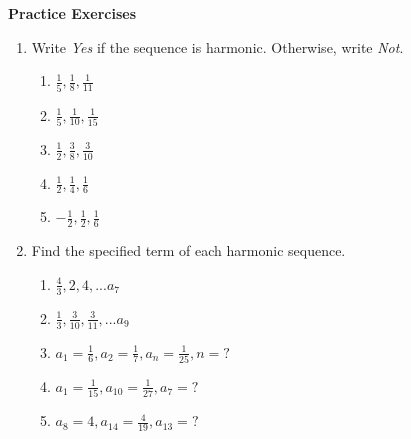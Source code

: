 \textbf{Practice Exercises}

\vspce
\begin{enumerate}[label = \Alph*. ]

\item Write \emph{Yes} if the sequence is harmonic. Otherwise, write \emph{Not}. 


\begin{enumerate}[label = \arabic*. ]

\item \hspce $\displaystyle \frac{1}{5}, \frac{1}{8}, \frac{1}{11} $ 
\vspce
\item \hspce $\displaystyle \frac{1}{5}, \frac{1}{10}, \frac{1}{15}$ 
\vspce
\item \hspce $\displaystyle \frac{1}{2}, \frac{3}{8}, \frac{3}{10}$
\vspce
\item \hspce $\displaystyle \frac{1}{2}, \frac{1}{4}, \frac{1}{6}$
\vspce
\item \hspce $\displaystyle -\frac{1}{2}, \frac{1}{2}, \frac{1}{6}$ 


\end{enumerate}

\item Find the specified term of each harmonic sequence. 
\begin{enumerate}[label = \arabic*. ]

\item \hspce $\displaystyle \frac{4}{3}, 2, 4,... a_7$ 
\vspce
\item \hspce $\displaystyle \frac{1}{3}, \frac{3}{10}, \frac{3}{11},... a_9$ 
\vspce
\item \hspce $a_1=\displaystyle \frac{1}{6}, a_2=\displaystyle \frac{1}{7}, a_n=\displaystyle \frac{1}{25},  n=? $
\vspce
\item \hspce $\displaystyle a_1=\frac{1}{15}, a_{10}=\frac{1}{27}, a_7=? $
\vspce
\item \hspce $\displaystyle a_8=4, a_{14}=\frac{4}{19}, a_{13}=? $ 

\end{enumerate}





\end{enumerate}
